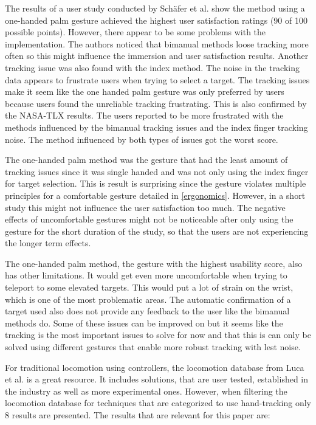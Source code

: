The results of a user study conducted by Schäfer et al. \cite{Schafer2021} show the method using a one-handed palm gesture achieved the highest user satisfaction ratings (90 of 100 possible points). However, there appear to be some problems with the implementation. The authors noticed that bimanual methods loose tracking more often so this might influence the immersion and user satisfaction results. Another tracking issue was also found with the index method. The noise in the tracking data appears to frustrate users when trying to select a target. The tracking issues make it seem like the one handed palm gesture was only preferred by users because users found the unreliable tracking frustrating. This is also confirmed by the NASA-TLX results. The users reported to be more frustrated with the methods influenced by the bimanual tracking issues and the index finger tracking noise. The method influenced by both types of issues got the worst score. 

The one-handed palm method was the gesture that had the least amount of tracking issues since it was single handed and was not only using the index finger for target selection. This is result is surprising since the gesture violates multiple principles for a comfortable gesture detailed in \ref{ergonomics}. However, in a short study this might not influence the user satisfaction too much. The negative effects of uncomfortable gestures might not be noticeable after only using the gesture for the short duration of the study, so that the users are not experiencing the longer term effects. 

The one-handed palm method, the gesture with the highest usability score, also has other limitations. It would get even more uncomfortable when trying to teleport to some elevated targets. This would put a lot of strain on the wrist, which is one of the most problematic areas. The automatic confirmation of a target used also does not provide any feedback to the user like the bimanual methods do. Some of these issues can be improved on but it seems like the tracking is the most important issues to solve for now and that this is can only be solved using different gestures that enable more robust tracking with lest noise.

For traditional locomotion using controllers, the locomotion database from Luca et al. \cite{Luca} is a great resource. It includes solutions, that are user tested, established in the industry as well as more experimental ones. However, when filtering the locomotion database for techniques that are categorized to use hand-tracking only 8 results are presented.
The results that are relevant for this paper are:


